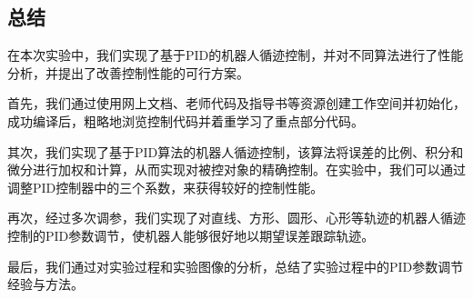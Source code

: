 \documentclass{xjtureport}
\begin{document}
\subsection{总结}
在本次实验中，我们实现了基于PID的机器人循迹控制，并对不同算法进行了性能分析，并提出了改善控制性能的可行方案。

首先，我们通过使用网上文档、老师代码及指导书等资源创建工作空间并初始化，成功编译后，粗略地浏览控制代码并着重学习了重点部分代码。

其次，我们实现了基于PID算法的机器人循迹控制，该算法将误差的比例、积分和微分进行加权和计算，从而实现对被控对象的精确控制。在实验中，我们可以通过调整PID控制器中的三个系数，来获得较好的控制性能。

再次，经过多次调参，我们实现了对直线、方形、圆形、心形等轨迹的机器人循迹控制的PID参数调节，使机器人能够很好地以期望误差跟踪轨迹。

最后，我们通过对实验过程和实验图像的分析，总结了实验过程中的PID参数调节经验与方法。
\end{document}
